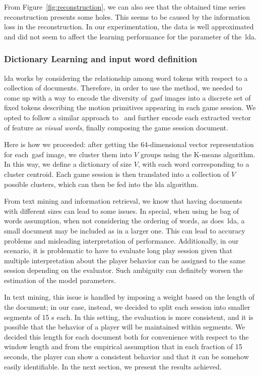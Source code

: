 From Figure~\ref{fig:reconstruction}, we can also see that the obtained time series reconstruction presents some holes. This seems to be caused by the information loss in the reconstruction. In our experimentation, the data is well approximated and did not seem to affect the learning performance for the parameter of the~\gls{lda}. 

\subsubsection{Dictionary Learning and input word definition}
\glsdesc{lda} works by considering the relationship among word tokens with respect to a collection of documents. Therefore, in order to use the method, we needed to come up with a way to encode the diversity of~\gls{gasf} images into a discrete set of fixed tokens describing the motion primitives appearing in each game session. We opted to follow a similar approach to~\cite{prince_computer_2012} and further encode each extracted vector of feature as \textit{visual words}, finally composing the game session document. 

Here is how we proceeded: after getting the 64-dimensional vector representation for each~\gls{gasf} image, we cluster them into $V$ groups using the K-means algorithm. In this way, we define a dictionary of size $V$, with each word corresponding to a cluster centroid. Each game session is then translated into a collection of $V$ possible clusters, which can then be fed into the \gls{lda} algorithm.

From text mining and information retrieval, we know that having documents with different sizes can lead to some issues. In special, when using he bag of words assumption, \ie when not considering the ordering of words, as does~\gls{lda}, a small document may be included as in a larger one. This can lead to accuracy problems and misleading interpretation of performance. Additionally, in our scenario, it is problematic to have to evaluate long play session given that multiple interpretation about the player behavior can be assigned to the same session depending on the evaluator. Such ambiguity can definitely worsen the estimation of the model parameters.

In text mining, this issue is handled by imposing a weight based on the length of the document; in our case, instead, we decided to split each session into smaller segments of 15 s each. In this setting, the evaluation is more consistent, and it is possible that the behavior of a player will be maintained within segments. We decided this length for each document both for convenience with respect to the window length and from the empirical assumption that in each fraction of 15 seconds, the player can show a consistent behavior and that it can be somehow easily identifiable. In the next section, we present the results achieved.

